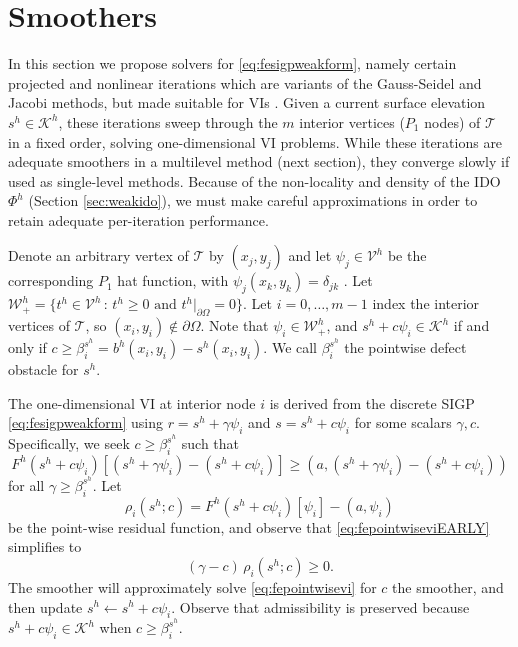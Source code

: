 \documentclass[letterpaper,final,12pt,reqno]{amsart}
\theoremstyle{claim}
\newcommand{\ip}[2]{\left(#1,#2\right)}
\numberwithin{equation}{section}
\numberwithin{figure}{section}
\numberwithin{table}{section}
\numberwithin{theorem}{section}
\begin{document}
\section{Smoothers} \label{sec:smoothers}

In this section we propose solvers for \eqref{eq:fesigpweakform}, namely certain projected and nonlinear iterations which are variants of the Gauss-Seidel and Jacobi methods, but made suitable for VIs \cite{KinderlehrerStampacchia1980}.  Given a current surface elevation $s^h\in \mathcal{K}^h$, these iterations sweep through the $m$ interior vertices ($P_1$ nodes) of $\mathcal{T}$ in a fixed order, solving one-dimensional VI problems.  While these iterations are adequate smoothers in a multilevel method (next section), they converge slowly if used as single-level methods.  Because of the non-locality and density of the IDO $\Phi^h$ (Section \ref{sec:weakido}), we must make careful approximations in order to retain adequate per-iteration performance.

Denote an arbitrary vertex of $\mathcal{T}$ by $(x_j,y_j)$ and let $\psi_j \in \mathcal{V}^h$ be the corresponding $P_1$ hat function, with $\psi_j(x_k,y_k)=\delta_{jk}$ \cite{Elmanetal2014}.  Let $\mathcal{W}_+^h = \{t^h \in \mathcal{V}^h \,:\, t^h \ge 0 \text{ and } t^h|_{\partial\Omega} = 0\}$.  Let $i=0,\dots,m-1$ index the interior vertices of $\mathcal{T}$, so $(x_i,y_i) \notin \partial\Omega$.  Note that $\psi_i \in \mathcal{W}_+^h$, and $s^h + c \psi_i \in \mathcal{K}^h$ if and only if $c\ge \beta_i^{s^h} = b^h(x_i,y_i) - s^h(x_i,y_i)$.  We call $\beta_i^{s^h}$ the pointwise defect obstacle \cite{GraeserKornhuber2009} for $s^h$.

The one-dimensional VI at interior node $i$ is derived from the discrete SIGP \eqref{eq:fesigpweakform} using $r = s^h+\gamma \psi_i$ and $s = s^h+c \psi_i$ for some scalars $\gamma,c$.  Specifically, we seek $c \ge \beta_i^{s^h}$ such that
\begin{equation}
F^h(s^h+c \psi_i)[(s^h+\gamma \psi_i) - (s^h+c \psi_i)] \ge \ip{a}{(s^h+\gamma \psi_i) - (s^h+c \psi_i)} \label{eq:fepointwiseviEARLY}
\end{equation}
for all $\gamma \ge \beta_i^{s^h}$.  Let
\begin{equation}
\rho_i(s^h; c) = F^h(s^h+c\psi_i)[\psi_i] - \ip{a}{\psi_i} \label{eq:ferhoi}
\end{equation}
be the point-wise residual function, and observe that \eqref{eq:fepointwiseviEARLY} simplifies to
\begin{equation}
(\gamma - c) \,\rho_i(s^h; c) \ge 0. \label{eq:fepointwisevi}
\end{equation}
The smoother will approximately solve \eqref{eq:fepointwisevi} for $c$ the smoother, and then update $s^h \gets s^h + c \psi_i$.  Observe that admissibility is preserved because $s^h+c \psi_i \in \mathcal{K}^h$ when $c \ge \beta_i^{s^h}$.
\end{document}
